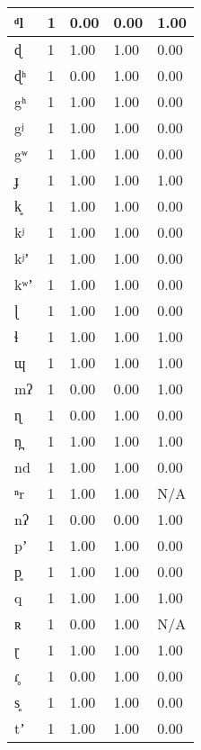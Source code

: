 \begin{longtable}{|l|l|l|l|l|}
ᵈl       & 1     & 0.00    & 0.00   & 1.00  \\ \hline
ɖ        & 1     & 1.00    & 1.00   & 0.00  \\ \hline
ɖʰ       & 1     & 0.00    & 1.00   & 0.00  \\ \hline
gʰ       & 1     & 1.00    & 1.00   & 0.00  \\ \hline
gʲ       & 1     & 1.00    & 1.00   & 0.00  \\ \hline
gʷ       & 1     & 1.00    & 1.00   & 0.00  \\ \hline
ɟ        & 1     & 1.00    & 1.00   & 1.00  \\ \hline
k͈       & 1     & 1.00    & 1.00   & 0.00  \\ \hline
kʲ       & 1     & 1.00    & 1.00   & 0.00  \\ \hline
kʲʼ      & 1     & 1.00    & 1.00   & 0.00  \\ \hline
kʷʼ      & 1     & 1.00    & 1.00   & 0.00  \\ \hline
ɭ        & 1     & 1.00    & 1.00   & 0.00  \\ \hline
ɬ        & 1     & 1.00    & 1.00   & 1.00  \\ \hline
ɰ        & 1     & 1.00    & 1.00   & 1.00  \\ \hline
mʔ       & 1     & 0.00    & 0.00   & 1.00  \\ \hline
ɳ        & 1     & 0.00    & 1.00   & 0.00  \\ \hline
n̪       & 1     & 1.00    & 1.00   & 1.00  \\ \hline
nd       & 1     & 1.00    & 1.00   & 0.00  \\ \hline
ⁿr       & 1     & 1.00    & 1.00   & N/A   \\ \hline
nʔ       & 1     & 0.00    & 0.00   & 1.00  \\ \hline
pʼ       & 1     & 1.00    & 1.00   & 0.00  \\ \hline
p͈       & 1     & 1.00    & 1.00   & 0.00  \\ \hline
q        & 1     & 1.00    & 1.00   & 1.00  \\ \hline
ʀ        & 1     & 0.00    & 1.00   & N/A   \\ \hline
ɽ        & 1     & 1.00    & 1.00   & 1.00  \\ \hline
ɾ̥       & 1     & 0.00    & 1.00   & 0.00  \\ \hline
s͈       & 1     & 1.00    & 1.00   & 0.00  \\ \hline
tʼ       & 1     & 1.00    & 1.00   & 0.00  \\ \hline

\end{longtable}
